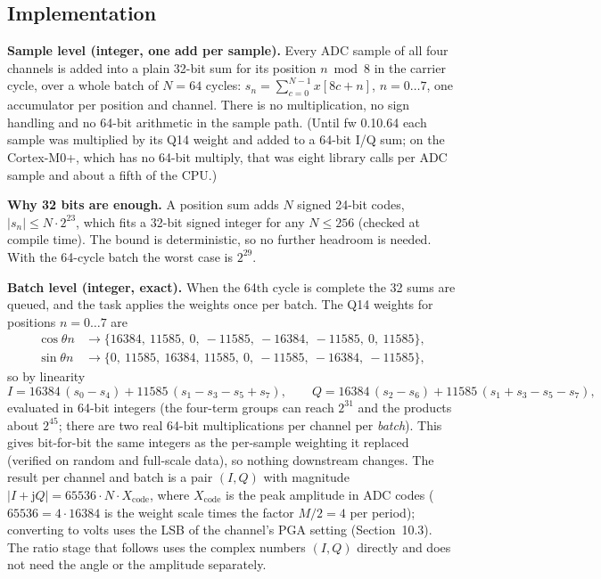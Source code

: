 \documentclass[11pt,a4paper]{article}
\begin{document}
\subsection{Implementation}

\textbf{Sample level (integer, one add per sample).}  Every ADC sample of all
four channels is added into a plain 32-bit sum for its position $n \bmod 8$ in
the carrier cycle, over a whole batch of $N=64$ cycles:
$s_n=\sum_{c=0}^{N-1} x[8c+n]$, $n=0\ldots7$, one accumulator per position and
channel.  There is no multiplication, no sign handling and no 64-bit
arithmetic in the sample path.  (Until fw 0.10.64 each sample was multiplied by
its Q14 weight and added to a 64-bit I/Q sum; on the Cortex-M0+, which has no
64-bit multiply, that was eight library calls per ADC sample and about a fifth
of the CPU.)

\textbf{Why 32 bits are enough.}  A position sum adds $N$ signed 24-bit codes,
$|s_n|\le N\cdot2^{23}$, which fits a 32-bit signed integer for any
$N\le256$ (checked at compile time).
The bound is deterministic, so no further headroom is needed.  With the 64-cycle
batch the worst case is $2^{29}$.

\textbf{Batch level (integer, exact).}  When the 64th cycle is complete the 32
sums are queued, and the task applies the weights once per batch.  The Q14
weights for positions $n=0\ldots7$ are
\begin{align*}
  \cos\theta n &\to \{16384,\ 11585,\ 0,\ -11585,\ -16384,\ -11585,\ 0,\ 11585\},\\
  \sin\theta n &\to \{0,\ 11585,\ 16384,\ 11585,\ 0,\ -11585,\ -16384,\ -11585\},
\end{align*}
so by linearity
\begin{equation}
  I = 16384\,(s_0-s_4) + 11585\,(s_1-s_3-s_5+s_7),\qquad
  Q = 16384\,(s_2-s_6) + 11585\,(s_1+s_3-s_5-s_7),
\end{equation}
evaluated in 64-bit integers (the four-term groups can reach $2^{31}$ and the
products about $2^{45}$; there are two real 64-bit multiplications per channel
per \emph{batch}).  This gives bit-for-bit the same integers as the
per-sample weighting it replaced (verified on random and full-scale data), so
nothing downstream changes.  The result per channel and batch is a pair
$(I,Q)$ with magnitude $|I+\mathrm{j}Q| = 65536\cdot N\cdot X_{\mathrm{code}}$,
where $X_{\mathrm{code}}$ is the peak amplitude in ADC codes
($65536=4\cdot16384$ is the weight scale times the factor $M/2=4$ per period);
converting to volts uses the LSB of the channel's PGA setting
(Section~10.3).  The ratio stage that follows uses the complex numbers $(I,Q)$
directly and does not need the angle or the amplitude separately.
\end{document}
